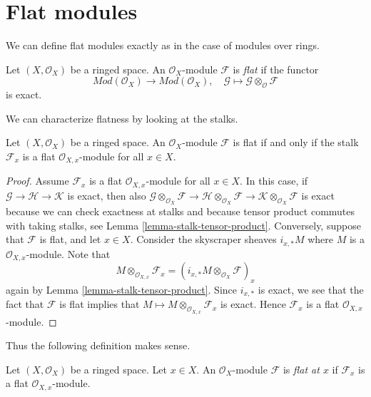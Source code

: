 \section{Flat modules}
\label{section-flat}

\noindent
We can define flat modules exactly as in the case of modules over rings.

\begin{definition}
\label{definition-flat}
Let $(X, \mathcal{O}_X)$ be a ringed space.
An $\mathcal{O}_X$-module $\mathcal{F}$ is {\it flat} if the functor
$$
\textit{Mod}(\mathcal{O}_X)
\longrightarrow
\textit{Mod}(\mathcal{O}_X), \quad
\mathcal{G} \mapsto \mathcal{G} \otimes_\mathcal{O} \mathcal{F}
$$
is exact.
\end{definition}

\noindent
We can characterize flatness by looking at the stalks.

\begin{lemma}
\label{lemma-flat-stalks-flat}
Let $(X, \mathcal{O}_X)$ be a ringed space.
An $\mathcal{O}_X$-module $\mathcal{F}$ is flat
if and only if the stalk $\mathcal{F}_x$ is a flat
$\mathcal{O}_{X, x}$-module for all $x \in X$.
\end{lemma}

\begin{proof}
Assume $\mathcal{F}_x$ is a flat $\mathcal{O}_{X, x}$-module for all
$x \in X$. In this case, if $\mathcal{G} \to \mathcal{H} \to \mathcal{K}$
is exact, then also
$\mathcal{G} \otimes_{\mathcal{O}_X} \mathcal{F} \to
\mathcal{H} \otimes_{\mathcal{O}_X} \mathcal{F} \to
\mathcal{K} \otimes_{\mathcal{O}_X} \mathcal{F}$
is exact because we can check exactness at stalks and because
tensor product commutes with taking stalks, see
Lemma \ref{lemma-stalk-tensor-product}.
Conversely, suppose that $\mathcal{F}$ is flat, and let $x \in X$.
Consider the skyscraper sheaves $i_{x, *} M$ where $M$ is a
$\mathcal{O}_{X, x}$-module. Note that
$$
M \otimes_{\mathcal{O}_{X, x}} \mathcal{F}_x =
\left(i_{x, *} M \otimes_{\mathcal{O}_X} \mathcal{F}\right)_x
$$
again by
Lemma \ref{lemma-stalk-tensor-product}.
Since $i_{x, *}$ is exact, we see that the fact that $\mathcal{F}$
is flat implies that $M \mapsto M \otimes_{\mathcal{O}_{X, x}} \mathcal{F}_x$
is exact. Hence $\mathcal{F}_x$ is a flat $\mathcal{O}_{X, x}$-module.
\end{proof}

\noindent
Thus the following definition makes sense.

\begin{definition}
\label{definition-flat-at-point}
Let $(X, \mathcal{O}_X)$ be a ringed space. Let $x \in X$.
An $\mathcal{O}_X$-module $\mathcal{F}$ is
{\it flat at $x$} if $\mathcal{F}_x$ is a flat
$\mathcal{O}_{X, x}$-module.
\end{definition}

